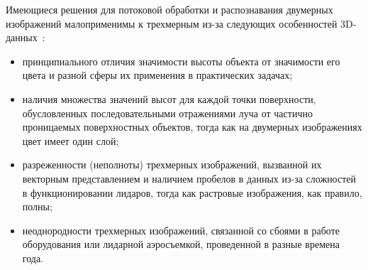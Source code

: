 \begin{multicols}{2}
   Имеющиеся решения для потоковой обработки и распознавания двумерных 
изображений малоприменимы к трехмерным из-за следующих особенностей 
3D-данных~\cite{7su}:
   \begin{itemize}
\item принципиального отличия значимости высоты объекта от значимости его 
цвета и разной сферы их применения в практических задачах;
\item наличия множества значений высот для каждой точки поверхности, 
обусловленных последовательными отражениями луча от частично 
проницаемых поверхностных объектов, тогда как на двумерных изображениях 
цвет имеет один слой;
\item разреженности (неполноты) трехмерных изоб\-ра\-же\-ний, вызванной их 
векторным пред\-став\-ле\-ни\-ем и наличием пробелов в данных из-за сложностей в 
функционировании лидаров, тогда как растровые изображения, как правило, 
полны;
\item неоднородности трехмерных изображений, связанной со сбоями в работе 
оборудования или лидарной аэросъемкой, проведенной в разные времена года.
\end{itemize}


\end{multicols}
